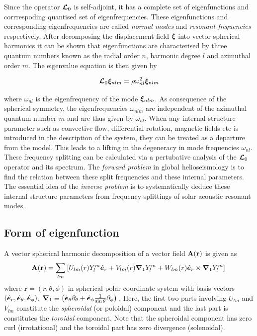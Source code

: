 Since the operator $\bm{\mathcal{L}}_0$ is self-adjoint, it has a complete set of eigenfunctions and corrrespoding quantised set of eigenfrequencies. These eigenfunctions and corresponding eigenfrequencies are called \textit{normal modes} and \textit{resonant frequencies} respectively. After decomposing the displacement field $\bm{\xi}$ into vector spherical harmonics it can be shown that eigenfunctions are characterised by three quantum numbers known as the radial order $n$, harmonic degree $l$ and azimuthal order $m$. The eigenvalue equation is then given by

\begin{equation}
\bm{\mathcal{L}}_{0}\bm{\xi}_{nlm} = \rho \omega_{nl}^2 \bm{\xi}_{nlm}
\end{equation}

where $\omega_{nl}$ is the eigenfrequency of the mode $\bm{\xi}_{nlm}$. As consequence of the spherical symmetry, the eigenfrequencies $\omega_{nlm}$ are independent of the azimuthal quantum number $m$ and are thus given by $\omega_{nl}$. When any internal structure parameter such as convective flow, differential rotation, magnetic fields etc is introduced in the description of the system, they can be treated as a departure from the \snr model. This leads to a lifting in the degeneracy in mode frequencies $\omega_{nl}$. These frequency splitting can be calculated via a pertubative analysis of the $\bm{\mathcal{L}}_0$ operator and its spectrum. The \textit{forward problem} in global helioseismology is to find the relation between these split frequencies and these internal parameters. The essential idea of the \textit{inverse problem} is to systematically deduce these internal structure parameters from frequency splittings of solar acoustic resonant modes.

\subsection{Form of eigenfunction}
A vector spherical harmonic decomposition of a vector field $\mathbf{A}(\mathbf{r})$ is given as 
\begin{equation}
\mathbf{A}(\mathbf{r}) = \sum_{lm} \left[ U_{lm}(r) Y_l^m \hat{\bm{e}}_{r} + V_{lm}(r) \bm{\nabla}_{1}Y_l^m + W_{lm}(r) \hat{\bm{e}}_{r} \times \bm{\nabla}_1 Y_{l}^{m} \right]\,
\end{equation}
where $\boldsymbol{r} = (r,\theta,\phi)$ in spherical polar coordinate system with basis vectors $(\hat{\bm{e}}_{r},\hat{\bm{e}}_{\theta},\hat{\bm{e}}_{\phi})$, $\bm{\nabla}_1 \equiv \left( \hat{\bm{e}}_{\theta}\partial_{\theta} + \hat{\bm{e}}_{\phi}\frac{1}{\sin\theta}\partial_{\phi}  \right)\,$. Here, the first two parts involving $U_{lm}$ and $V_{lm}$ constitute the \textit{spheroidal} (or poloidal) component and the last part is constitutes the \textit{toroidal} component. Note that the spheroidal component has zero curl (irrotational) and the toroidal part has zero divergence (solenoidal).

